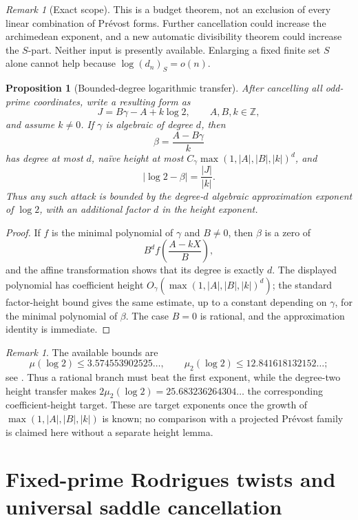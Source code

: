 \documentclass[11pt]{article}
\theoremstyle{keio}
\newtheorem{proposition}[theorem]{Proposition}
\theoremstyle{definition}
\theoremstyle{remark}
\newtheorem{remark}[theorem]{Remark}
\newcommand{\Z}{\mathbb Z}
\begin{document}
\begin{remark}[Exact scope]
This is a budget theorem, not an exclusion of every linear combination of
Pr\'evost forms.  Further cancellation could increase the archimedean
exponent, and a new automatic divisibility theorem could increase the
\(S\)-part.  Neither input is presently available.  Enlarging a fixed finite
set \(S\) alone cannot help because \(\log(d_n)_S=o(n)\).
\end{remark}

\begin{proposition}[Bounded-degree logarithmic transfer]
\label{prop:bounded-degree-transfer}
After cancelling all odd-prime coordinates, write a resulting form as
\[
 J=B\gamma-A+k\log2,
 \qquad A,B,k\in\Z,
\]
and assume \(k\ne0\).  If \(\gamma\) is algebraic of degree \(d\), then
\[
 \beta=\frac{A-B\gamma}{k}
\]
has degree at most \(d\), naïve height at most
\(C_\gamma\max(1,|A|,|B|,|k|)^d\), and
\[
 |\log2-\beta|=\frac{|J|}{|k|}.
\]
Thus any such attack is bounded by the degree-\(d\) algebraic approximation
exponent of \(\log2\), with an additional factor \(d\) in the height
exponent.
\end{proposition}

\begin{proof}
If \(f\) is the minimal polynomial of \(\gamma\) and \(B\ne0\), then
\(\beta\) is a zero of
\[
 B^df\!\left(\frac{A-kX}{B}\right),
\]
and the affine transformation shows that its degree is exactly \(d\).
The displayed polynomial has coefficient height
\(O_\gamma(\max(1,|A|,|B|,|k|)^d)\); the standard factor-height bound
gives the same estimate, up to a constant depending on \(\gamma\), for the
minimal polynomial of \(\beta\).  The case \(B=0\) is rational, and the
approximation identity is immediate.
\end{proof}

\begin{remark}
The available bounds are
\[
 \mu(\log2)\le3.574553902525\ldots,
 \qquad
 \mu_2(\log2)\le12.841618132152\ldots;
\]
see \cite{Marcovecchio2009,Marcovecchio2025}.  Thus a rational branch must
beat the first exponent, while the degree-two height transfer makes
\(2\mu_2(\log2)=25.683236264304\ldots\) the corresponding coefficient-height
target.  These are target exponents once the growth of
\(\max(1,|A|,|B|,|k|)\) is known; no comparison with a projected Pr\'evost
family is claimed here without a separate height lemma.
\end{remark}

\section{Fixed-prime Rodrigues twists and universal saddle cancellation}
\label{sec:fixed-prime-rodrigues}
\end{document}
